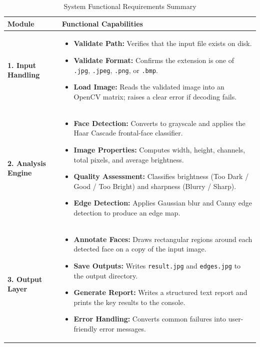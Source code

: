 \documentclass[11pt,a4paper]{article}
\begin{document}
\begin{table}[H]
\centering
\small
\renewcommand{\arraystretch}{1.3}
\begin{tabularx}{\textwidth}{p{3.2cm}X}
\toprule
\textbf{Module} & \textbf{Functional Capabilities} \\
\midrule
\textbf{1. Input Handling} &
\begin{itemize}[leftmargin=1em,nosep]
    \item \textbf{Validate Path:} Verifies that the input file exists on disk.
    \item \textbf{Validate Format:} Confirms the extension is one of \texttt{.jpg}, \texttt{.jpeg}, \texttt{.png}, or \texttt{.bmp}.
    \item \textbf{Load Image:} Reads the validated image into an OpenCV matrix; raises a clear error if decoding fails.
\end{itemize} \\
\midrule
\textbf{2. Analysis Engine} &
\begin{itemize}[leftmargin=1em,nosep]
    \item \textbf{Face Detection:} Converts to grayscale and applies the Haar Cascade frontal-face classifier.
    \item \textbf{Image Properties:} Computes width, height, channels, total pixels, and average brightness.
    \item \textbf{Quality Assessment:} Classifies brightness (Too Dark / Good / Too Bright) and sharpness (Blurry / Sharp).
    \item \textbf{Edge Detection:} Applies Gaussian blur and Canny edge detection to produce an edge map.
\end{itemize} \\
\midrule
\textbf{3. Output Layer} &
\begin{itemize}[leftmargin=1em,nosep]
    \item \textbf{Annotate Faces:} Draws rectangular regions around each detected face on a copy of the input image.
    \item \textbf{Save Outputs:} Writes \texttt{result.jpg} and \texttt{edges.jpg} to the output directory.
    \item \textbf{Generate Report:} Writes a structured text report and prints the key results to the console.
    \item \textbf{Error Handling:} Converts common failures into user-friendly error messages.
\end{itemize} \\
\bottomrule
\end{tabularx}
\caption{System Functional Requirements Summary}
\label{tab:functional_reqs}
\end{table}
\end{document}
